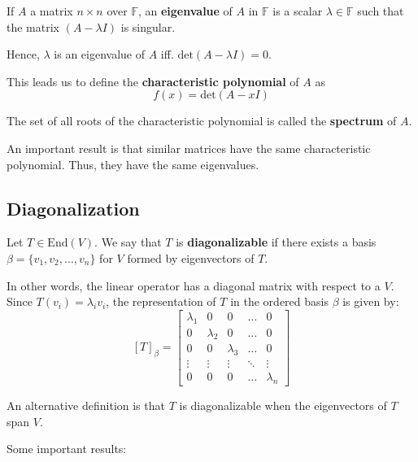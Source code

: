 \begin{definition}
	If $A$ a matrix $n \times n$ over $\mathbb{F}$, an \textbf{eigenvalue} of $A$ in $\mathbb{F}$ is a scalar $\lambda \in \mathbb{F}$ such that the matrix $(A - \lambda I)$ is singular.
\end{definition}

Hence, $\lambda$ is an eigenvalue of $A$ iff. $\text{det}(A-\lambda I) = 0$.

\begin{definition}
	This leads us to define the \textbf{characteristic polynomial} of $A$ as \[ f(x) = \text{det}(A-xI) \]

	The set of all roots of the characteristic polynomial is called the \textbf{spectrum} of $A$.
\end{definition}

An important result is that similar matrices have the same characteristic polynomial. Thus, they have the same eigenvalues.

\subsection*{Diagonalization}

\begin{definition}[Diagonalization]
	Let $T \in \text{End}(V)$. We say that $T$ is \textbf{diagonalizable} if there exists a basis $\beta = \{ v_1, v_2, \ldots, v_n \}$ for $V$ formed by eigenvectors of $T$.
\end{definition}

In other words, the linear operator has a diagonal matrix with respect to a $V$. Since $T(v_i) = \lambda_i v_i$, the representation of $T$ in the ordered basis $\beta$ is given by:
\[
	[T]_{\beta} = \begin{bmatrix}
	\lambda_1 & 0 & 0 & \ldots & 0 \\
	0 & \lambda_2 & 0 & \ldots & 0 \\
	0 & 0 & \lambda_3 & \ldots & 0 \\
	\vdots & \vdots & \vdots & \ddots & \vdots \\
	0 & 0 & 0 & \ldots & \lambda_n
	\end{bmatrix}
\]

An alternative definition is that $T$ is diagonalizable when the eigenvectors of $T$ span $V$.

Some important results:

